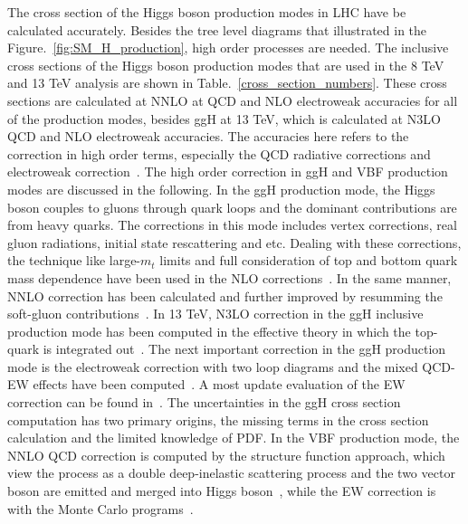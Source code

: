 The cross section of the Higgs boson production modes in LHC have be calculated accurately. Besides the tree level diagrams that illustrated in the Figure.~\ref{fig:SM_H_production}, high order processes are needed. The inclusive cross sections of the Higgs boson production modes that are used in the 8 TeV and 13 TeV analysis are shown in Table.~\ref{cross_section_numbers}. These cross sections are calculated at NNLO at QCD and NLO electroweak accuracies for all of the production modes, besides ggH at 13 TeV, which is calculated at N3LO QCD and NLO electroweak accuracies. The accuracies here refers to the correction in high order terms, especially the QCD radiative corrections and electroweak correction~\cite{Dittmaier:1318996}. The high order correction in ggH and VBF production modes are discussed in the following. In the ggH production mode, the Higgs boson couples to gluons through quark loops and the dominant contributions are from heavy quarks. The corrections in this mode includes vertex corrections, real gluon radiations, initial state rescattering and etc. Dealing with these corrections, the technique like large-$m_{t}$ limits and full consideration of top and bottom quark mass dependence have been used in the NLO corrections~\cite{Djouadi:1991tka}. In the same manner, NNLO correction has been calculated and further improved by resumming the soft-gluon contributions~\cite{Catani:2003zt}. In 13 TeV, N3LO correction in the ggH inclusive production mode has been computed in the effective theory in which the top-quark is integrated out~\cite{deFlorian:2227475}. The next important correction in the ggH production mode is the electroweak correction with two loop diagrams and the mixed QCD-EW effects have been computed~\cite{Anastasiou:2008tj}. A most update evaluation of the EW correction can be found in~\cite{deFlorian:2227475}. The uncertainties in the ggH cross section computation has two primary origins, the missing terms in the cross section calculation and the limited knowledge of PDF. In the VBF production mode, the NNLO QCD correction is computed by the structure function approach, which view the process as a double deep-inelastic scattering process and the two vector boson are emitted and merged into Higgs boson~\cite{Bolzoni:2010xr}, while the EW correction is with the Monte Carlo programs~\cite{Dittmaier:1416519}. 
 


